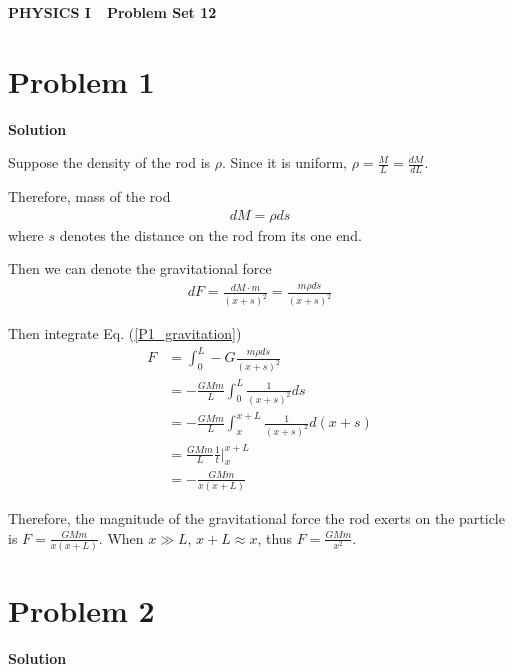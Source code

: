 \documentclass[12pt,a4paper]{article}
\begin{document}
\centerline{\Huge{{\textbf{PHYSICS I\ \ Problem Set 12}}}}
\vspace{0.5cm}
\section*{\large \textbf{Problem 1}}

{\textbf{Solution}}

Suppose the density of the rod is $\rho$. Since it is uniform, $\rho = \frac{M}{L} = \frac{dM}{dL}$.

Therefore, mass of the rod
\begin{align}
	dM = \rho ds
	\label{P1_mass}
\end{align}
where $s$ denotes the distance on the rod from its one end.

Then we can denote the gravitational force
\begin{align}
	dF = \frac{dM \cdot m}{(x+s)^2} = \frac{m\rho ds}{(x+s)^2}
	\label{P1_gravitation}
\end{align}

Then integrate Eq. (\ref{P1_gravitation})
\begin{align}
 F &= \int_0^{L} -G\frac{m\rho ds}{(x+s)^2} \nonumber\\
 &= -\frac{GMm}{L} \int_0^L \frac{1}{(x+s)^2} ds \nonumber\\
 &= -\frac{GMm}{L} \int_x^{x+L} \frac{1}{(x+s)^2} d(x+s) \nonumber\\
 &= \frac{GMm}{L} \frac{1}{t} \lvert_{x}^{x+L} \nonumber\\
 &= -\frac{GMm}{x(x+L)}
 \label{P1_answer}
\end{align}

Therefore, the magnitude of the
gravitational force the rod exerts on the particle is $F = \frac{GMm}{x(x+L)}$. When $x \gg L$, $x+L \approx x$, thus $F = \frac{GMm}{x^2}$.


\section*{\large \textbf{Problem 2}}

{\textbf{Solution}}
\end{document}
